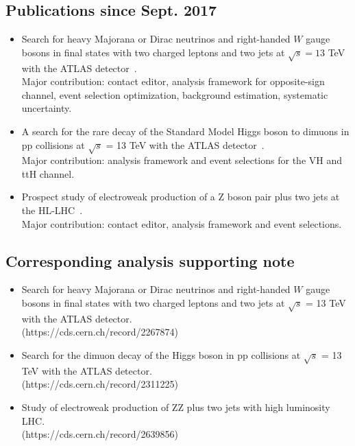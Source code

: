 \subsection{Publications since Sept. 2017}
\begin{itemize}
  \item Search for heavy Majorana or Dirac neutrinos and right-handed $W$ gauge bosons in final states with two charged leptons and two jets
        at $\sqrt{s} = 13$ TeV with the ATLAS detector~\cite{Aaboud:2018spl}.
        \\
        Major contribution: contact editor, analysis framework for opposite-sign channel, event selection optimization, background estimation, systematic uncertainty.
  \item A search for the rare decay of the Standard Model Higgs boson to dimuons in pp collisions at $\sqrt{s}$ = 13 TeV with the ATLAS detector~\cite{ATLAS-CONF-2018-026}.
        \\
        Major contribution: analysis framework and event selections for the VH and ttH channel.
  \item Prospect study of electroweak production of a Z boson pair plus two jets at the HL-LHC~\cite{ATL-PHYS-PUB-2018-029}.
        \\
        Major contribution: contact editor, analysis framework and event selections.
\end{itemize}


\subsection{Corresponding analysis supporting note}
\begin{itemize}
  \item Search for heavy Majorana or Dirac neutrinos and right-handed $W$ gauge bosons in final states with two charged leptons and two jets at
        $\sqrt{s}$ = 13 TeV with the ATLAS detector.
        \\
        (https://cds.cern.ch/record/2267874)
  \item Search for the dimuon decay of the Higgs boson in pp collisions at $\sqrt{s}$ = 13 TeV with the ATLAS detector.
        \\
        (https://cds.cern.ch/record/2311225)
  \item Study of electroweak production of ZZ plus two jets with high luminosity LHC.
        \\
        (https://cds.cern.ch/record/2639856)
\end{itemize}


